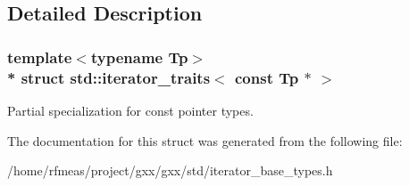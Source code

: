\subsection{Detailed Description}
\subsubsection*{template$<$typename Tp$>$\\*
struct std\+::iterator\+\_\+traits$<$ const Tp $\ast$ $>$}

Partial specialization for const pointer types. 

The documentation for this struct was generated from the following file\+:\begin{DoxyCompactItemize}
\item 
/home/rfmeas/project/gxx/gxx/std/iterator\+\_\+base\+\_\+types.\+h\end{DoxyCompactItemize}
